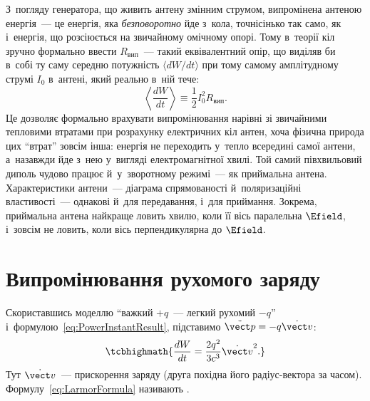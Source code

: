 З~погляду генератора, що живить антену змінним струмом, випромінена антеною енергія~--- це
енергія, яка \emph{безповоротно} йде з~кола, точнісінько так само, як і~енергія, що
розсіюється на звичайному омічному опорі. Тому в~теорії кіл зручно формально ввести
 $R_\text{вип}$~--- такий еквівалентний опір, що виділяв би
в~собі ту саму середню потужність $\langle dW/dt\rangle$ при тому самому амплітудному
струмі $I_0$ в~антені, який реально в~ній тече:
\begin{equation*}
	\left\langle\frac{dW}{dt}\right\rangle \equiv \frac12 I_0^2 R_\text{вип}.
\end{equation*}
Це дозволяє формально врахувати випромінювання нарівні зі звичайними тепловими втратами
при розрахунку електричних кіл антен, хоча фізична природа цих \enquote{втрат} зовсім
інша: енергія не переходить у~тепло всередині самої антени, а~назавжди йде з~нею у~вигляді
електромагнітної хвилі. Той самий півхвильовий диполь чудово працює й~у~зворотному
режимі~--- як приймальна антена. Характеристики
антени~--- діаграма спрямованості й~поляризаційні властивості~--- однакові й~для
передавання, і~для приймання. Зокрема, приймальна антена найкраще ловить хвилю, коли її вісь
паралельна $\Efield$, і~зовсім не ловить, коли вісь перпендикулярна до $\Efield$.



\section{Випромінювання рухомого заряду}\hypertarget{moving-charge-radiation}{}

Скориставшись моделлю \enquote{важкий $+q$~--- легкий рухомий $-q$} і~формулою~\eqref{eq:PowerInstantResult}, підставимо
$\ddot{\vect p} = -q\dot{\vect v}$:
\begin{equation}\label{eq:LarmorFormula}
	\tcbhighmath{ \frac{dW}{dt} = \frac{2q^2}{3c^3}\dot{\vect v}^2. }
\end{equation}
Тут $\dot{\vect v}$~--- прискорення заряду (друга похідна його радіус-вектора за часом).
Формулу~\eqref{eq:LarmorFormula} називають .

